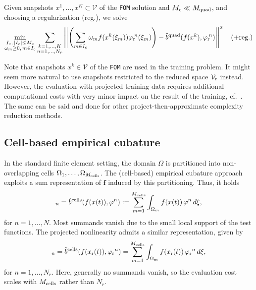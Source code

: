 \documentclass[onefignum,onetabnum]{siamart251104}
\newcommand{\bv}[1]{{\mathbf #1}}
\newcommand{\funSpace}[1]{\mathcal{#1}}
\newcommand{\com}[1]{{{#1}_{\rm{c}}}} %
\newcommand{\rom}[1]{{{#1}_{\rm{r}}}}
\newcommand{\Nr}{{N_r}}
\newcommand{\ffun}{{\bv{f}}}
\newcommand{\bform}{{b}}
\newcommand{\tL}{{\fs{\varphi}}}
\newcommand{\fs}[1]{{{#1}}} %
\newcommand{\wei}{{\omega}} %
\newcommand{\xp}{{\xi}} %
\newcommand{\acro}[1]{{\texttt{#1}}}  %
\begin{document}
Given snapshots $\fs{x}^1, \ldots, \fs{x}^K \subset \funSpace{V}$ of the \acro{FOM} solution and $\com{M} \ll M_{\rm{quad}}$, and choosing a regularization (reg.), we solve
{\small
\begin{align*} %
	\min_{\substack{I_c, \,|I_c| \leq \com{M}\\
			            \wei_m \geq 0, \,m \in I_c } }
\sum_{\substack{k = 1,\ldots,K\\ n= 1,\ldots,\Nr}}			            
			             \left|\left| \left(\sum_{m \in I_c} {\wei}_m {f}({\fs{x}}^k({\xp}_m))\rom{\tL}\!^n({\xp}_m) \right)
			             - \tilde{\bform}^{\rm{quad}}({f}({\fs{x}}^k), \rom{\tL}\!^n)\right|\right|^2
\quad \text{(+reg.)}
\end{align*}
}%
\begin{rmrk}
Note that snapshots ${\fs{x}}^k \in \funSpace{V}$ of the \acro{FOM} are used in the training problem. It might seem more natural to use snapshots restricted to the reduced space $\rom{\funSpace{V}}$ instead. However, the evaluation with projected training data requires additional computational costs with very minor impact on the result of the training, cf.~\cite{art:hyperreduction-fem-cubature,art:comred-ecsw}. The same can be said and done for other project-then-approximate complexity reduction methods.
 \end{rmrk}


\subsection{Cell-based empirical cubature} \label{subsec:empCub}
In the standard finite element setting, the domain $\Omega$ is partitioned into non-overlapping cells $\Omega_1,\ldots,\Omega_{M_{\rm cells}}$. The (cell-based) empirical cubature approach exploits a sum representation of $\ffun$ induced by this partitioning. Thus, it holds
\begin{align*}
[\ffun(\bv{x}(t))]_n = \tilde{\bform}^{\rm cells}(f(\fs{x}(t)),\tL^n) := \sum_{m=1}^{M_{\rm cells}} \int_{\Omega_m} f(\fs{x}(t)) \, \tL^n \, d\xp,
\end{align*}
for $n = 1,\ldots,N$. Most summands vanish due to the small local support of the test functions.
The projected nonlinearity admits a similar representation, given by
\begin{align*}
[\rom{\ffun}(\rom{\bv{x}}(t))]_n = \tilde{\bform}^{\rm cells}(f(\rom{\fs{x}}(t)),\rom{\tL}^n) = \sum_{m=1}^{M_{\rm cells}} \int_{\Omega_m} f(\rom{\fs{x}}(t)) \, \rom{\tL}^n \, d\xp,
\end{align*}
for $n = 1,\ldots,\Nr$. Here, generally no summands vanish, so the evaluation cost scales with $M_{\rm cells}$ rather than $\Nr$.
\end{document}
